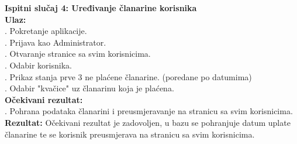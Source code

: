 \documentclass[times, utf8, zavrsni]{fer}
\begin{document}
        \noindent \textbf{Ispitni slučaj 4: Uređivanje članarine korisnika}\\
			\textbf{Ulaz:}\\
			    . Pokretanje aplikacije.\\
			    . Prijava kao Administrator.\\
			    . Otvaranje stranice sa svim korisnicima.\\
			    . Odabir korisnika.\\
			    . Prikaz stanja prve 3 ne plaćene članarine. (poredane po datumima)\\
			    . Odabir "kvačice" uz članarinu koja je plaćena.\\
			   
			\noindent\textbf{Očekivani rezultat:}\\
			    . Pohrana podataka članarini i preusmjeravanje na stranicu sa svim korisnicima.\\
			    
			\noindent\textbf{Rezultat:}
			    \noindent Očekivani rezultat je zadovoljen, u bazu se pohranjuje datum uplate članarine te se korisnik preusmjerava na stranicu sa svim korisnicima.
			    
\end{document}
